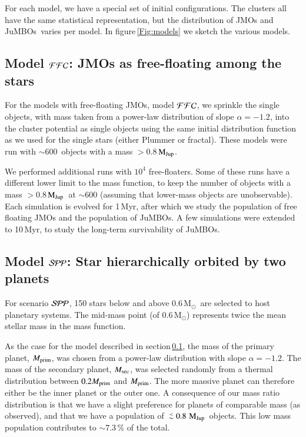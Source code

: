 \documentclass[submission,phys]{lib/SciPost}
\newcommand{\MSun}{\mbox{$\mathrm{{M}}_\odot$}}
\newcommand{\MJup}{\mbox{$\mathrm{{M}}_{\rm Jup}$}}
\def\aplt{\ {\raise-.5ex\hbox{$\buildrel<\over\sim$}}\ }
\newcommand{\jumbos}{\mbox{JuMBOs}}
\begin{document}
For each model, we have a special set of initial
configurations. The clusters all have the same statistical
representation, but the distribution of JMOs and \jumbos\, varies per model.
In figure\,\ref{Fig:models} we sketch the various models.

\subsection{Model ${\cal FFC}$: JMOs as free-floating among the stars}\label{Sect:FFC}

For the models with free-floating JMOs, model ${\cal FFC}$, 
we sprinkle the single objects, with mass taken from a power-law distribution
of slope $\alpha = -1.2$, into the cluster potential as single
objects using the same initial distribution function as we used for
the single stars (either Plummer or fractal).  These models were run
with $\sim 600$\, objects with a mass $>0.8$\,\MJup. 

We performed additional runs with $10^4$ free-floaters. Some of these
runs have a different lower limit to the mass function, to keep the
number of objects with a mass $>0.8$\,\MJup\, at $\sim 600$ (assuming
that lower-mass objects are unobservable).  Each simulation
is evolved for 1\,Myr, after which we study the population of free
floating JMOs and the population of \jumbos. A few
simulations were extended to 10\,Myr, to study the long-term
survivability of \jumbos.

\subsection{Model ${\cal SPP}$: Star hierarchically orbited by two planets}

For scenario ${\cal SPP}$, 150 stars below and above 0.6\,\MSun\,
are selected to host planetary systems. The mid-mass point (of 0.6\,$\MSun$) 
represents twice the mean stellar mass in the mass function.

As the case for the model described in section\,\ref{Sect:FFC}, the
mass of the primary planet, $M_{\rm prim}$, was chosen from a
power-law distribution with slope $\alpha=-1.2$. The mass of the
secondary planet, $M_{\rm sec}$, was selected randomly from a thermal
distribution between $0.2 M_{\rm prim}$ and $M_{\rm prim}$.  The more
massive planet can therefore either be the inner planet or the outer
one. A consequence of our mass ratio distribution is that we have a
slight preference for planets of comparable mass (as observed), and
that we have a population of $\aplt 0.8$\,\MJup\, objects. This
low mass population contributes to $\sim 7.3$\,\% of the total.
\end{document}
